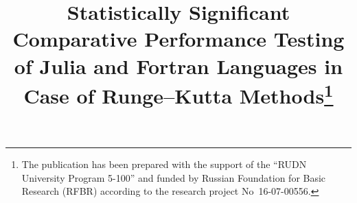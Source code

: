 \title{Statistically Significant Comparative Performance Testing of
Julia and Fortran Languages in Case of Runge--Kutta Methods\thanks{The
publication has been prepared with the support of the ``RUDN
University Program 5-100'' and funded by Russian Foundation for Basic
Research (RFBR) according to the research project No~16-07-00556.}}

